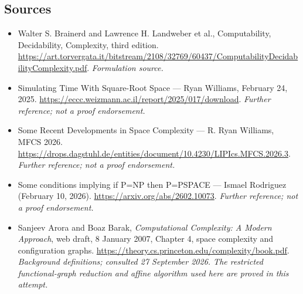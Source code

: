 \documentclass[11pt]{article}
\begin{document}
\subsection{Sources}
\begin{itemize}
\item[S1]Walter S. Brainerd and Lawrence H. Landweber et al., Computability, Decidability, Complexity, third edition.
\url{https://art.torvergata.it/bitstream/2108/32769/60437/ComputabilityDecidabilityComplexity.pdf}.
\textit{Formulation source.}
\item[S2]Simulating Time With Square-Root Space — Ryan Williams, February 24, 2025.
\url{https://eccc.weizmann.ac.il/report/2025/017/download}.
\textit{Further reference; not a proof endorsement.}
\item[S3]Some Recent Developments in Space Complexity — R. Ryan Williams, MFCS 2026.
\url{https://drops.dagstuhl.de/entities/document/10.4230/LIPIcs.MFCS.2026.3}.
\textit{Further reference; not a proof endorsement.}
\item[S4]Some conditions implying if P=NP then P=PSPACE — Ismael Rodriguez (February 10, 2026).
\url{https://arxiv.org/abs/2602.10073}.
\textit{Further reference; not a proof endorsement.}
\item[E1]Sanjeev Arora and Boaz Barak,
\emph{Computational Complexity: A Modern Approach}, web draft,
8 January 2007, Chapter 4, space complexity and configuration graphs.
\url{https://theory.cs.princeton.edu/complexity/book.pdf}.
\textit{Background definitions; consulted 27 September 2026. The restricted
functional-graph reduction and affine algorithm used here are proved in
this attempt.}
\end{itemize}
\end{document}
